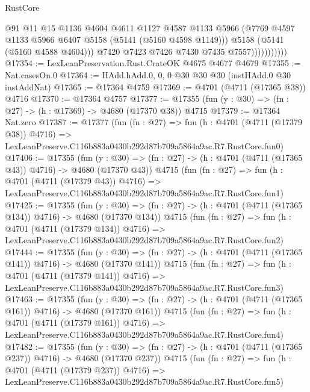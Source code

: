 \begin{lexlean}{RustCore}
\begin{coremodule}
                            @91
                            @11
                            @15
                            @1136
                            @4604
                            @4611
                            @1127
                            @4587
                            @1133
                            @5966
                            (@7769 @4597 @1133 @5966 @6407 @5158 (@5141 (@5160 @4598 @1149)))
                            @5158
                            (@5141 (@5160 @4588 @4604)))
                          @7420
                          @7423
                          @7426
                          @7430
                          @7435
                          @7557)))))))))))
@17354 := LexLeanPreservation.Rust.CrateOK @4675 @4677 @4679
@17355 := Nat.casesOn.{0}
@17364 := HAdd.hAdd.{0, 0, 0} @30 @30 @30 (instHAdd.{0} @30 instAddNat)
@17365 := @17364 @4759
@17369 := @4701 (@4711 (@17365 @38)) @4716
@17370 := @17364 @4757
@17377 := @17355 (fun (y : @30) => (fn : @27) -> (h : @17369) -> @4680 (@17370 @38)) @4715
@17379 := @17364 Nat.zero
@17387 := @17377
    (fun (fn : @27) =>
    fun (h : @4701 (@4711 (@17379 @38)) @4716) =>
    LexLeanPreserve.C116b883a0430b292d87b709a5864a9ac.R7.RustCore.fun0)
@17406 := @17355
    (fun (y : @30) => (fn : @27) -> (h : @4701 (@4711 (@17365 @43)) @4716) -> @4680 (@17370 @43))
    @4715
    (fun (fn : @27) =>
    fun (h : @4701 (@4711 (@17379 @43)) @4716) =>
    LexLeanPreserve.C116b883a0430b292d87b709a5864a9ac.R7.RustCore.fun1)
@17425 := @17355
    (fun (y : @30) => (fn : @27) -> (h : @4701 (@4711 (@17365 @134)) @4716) -> @4680 (@17370 @134))
    @4715
    (fun (fn : @27) =>
    fun (h : @4701 (@4711 (@17379 @134)) @4716) =>
    LexLeanPreserve.C116b883a0430b292d87b709a5864a9ac.R7.RustCore.fun2)
@17444 := @17355
    (fun (y : @30) => (fn : @27) -> (h : @4701 (@4711 (@17365 @141)) @4716) -> @4680 (@17370 @141))
    @4715
    (fun (fn : @27) =>
    fun (h : @4701 (@4711 (@17379 @141)) @4716) =>
    LexLeanPreserve.C116b883a0430b292d87b709a5864a9ac.R7.RustCore.fun3)
@17463 := @17355
    (fun (y : @30) => (fn : @27) -> (h : @4701 (@4711 (@17365 @161)) @4716) -> @4680 (@17370 @161))
    @4715
    (fun (fn : @27) =>
    fun (h : @4701 (@4711 (@17379 @161)) @4716) =>
    LexLeanPreserve.C116b883a0430b292d87b709a5864a9ac.R7.RustCore.fun4)
@17482 := @17355
    (fun (y : @30) => (fn : @27) -> (h : @4701 (@4711 (@17365 @237)) @4716) -> @4680 (@17370 @237))
    @4715
    (fun (fn : @27) =>
    fun (h : @4701 (@4711 (@17379 @237)) @4716) =>
    LexLeanPreserve.C116b883a0430b292d87b709a5864a9ac.R7.RustCore.fun5)

\end{coremodule}
\end{lexlean}
